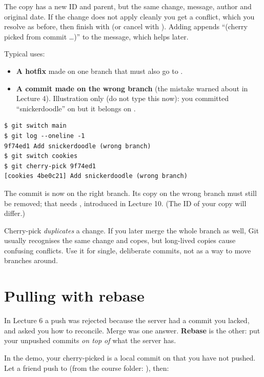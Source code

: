 The copy has a new ID and parent, but the same change, message, author and original date. If the change does not apply cleanly you get a conflict, which you resolve as before, then finish with  (or cancel with ). Adding  appends ``(cherry picked from commit \dots)'' to the message, which helps later.

Typical uses:
\begin{itemize}
  \item \textbf{A hotfix} made on one branch that must also go to .
  \item \textbf{A commit made on the wrong branch} (the mistake warned about in Lecture 4). Illustration only (do not type this now): you committed ``snickerdoodle'' on  but it belongs on .
\end{itemize}

\begin{lstlisting}
$ git switch main
$ git log --oneline -1
9f74ed1 Add snickerdoodle (wrong branch)
$ git switch cookies
$ git cherry-pick 9f74ed1
[cookies 4be0c21] Add snickerdoodle (wrong branch)
\end{lstlisting}

The commit is now on the right branch. Its copy on the wrong branch must still be removed; that needs , introduced in Lecture 10. (The ID of your copy will differ.)

\begin{pitfall}
Cherry-pick \emph{duplicates} a change. If you later merge the whole branch as well, Git usually recognises the same change and copes, but long-lived copies cause confusing conflicts. Use it for single, deliberate commits, not as a way to move branches around.
\end{pitfall}

\section{Pulling with rebase}

In Lecture 6 a push was rejected because the server had a commit you lacked, and  asked you how to reconcile. Merge was one answer. \textbf{Rebase} is the other: put your unpushed commits \emph{on top of} what the server has.

In the demo, your cherry-picked  is a local commit on  that you have not pushed. Let a friend push to  (from the course folder: ), then:

